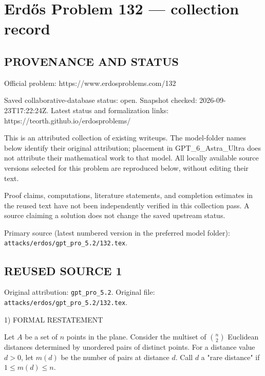 \section*{Erd\H{o}s Problem 132 --- collection record}

\subsection*{PROVENANCE AND STATUS}
Official problem: https://www.erdosproblems.com/132

Saved collaborative-database status: open.
Snapshot checked: 2026-09-23T17:22:24Z.
Latest status and formalization links: https://teorth.github.io/erdosproblems/

This is an attributed collection of existing writeups. The model-folder names below identify their original attribution; placement in GPT\_6\_Astra\_Ultra does not attribute their mathematical work to that model. All locally available source versions selected for this problem are reproduced below, without editing their text.

Proof claims, computations, literature statements, and completion estimates in the reused text have not been independently verified in this collection pass. A source claiming a solution does not change the saved upstream status.

Primary source (latest numbered version in the preferred model folder): \texttt{attacks/erdos/gpt\_pro\_5.2/132.tex}.

\subsection*{REUSED SOURCE 1}
Original attribution: \texttt{gpt\_pro\_5.2}.
Original file: \texttt{attacks/erdos/gpt\_pro\_5.2/132.tex}.


1) FORMAL RESTATEMENT

Let $A$ be a set of $n$ points in the plane. Consider the multiset of $\binom{n}{2}$ Euclidean distances determined by unordered pairs of distinct points.
For a distance value $d>0$, let $m(d)$ be the number of pairs at distance $d$.
Call $d$ a "rare distance" if $1\le m(d)\le n$.

